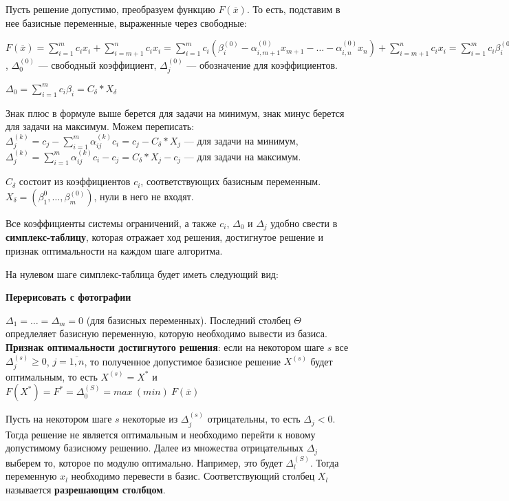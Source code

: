 \documentclass{article}
\begin{document}
Пусть решение допустимо, преобразуем функцию $F(\overline{x})$. То есть, подставим в нее базисные переменные, выраженные через свободные:

$F(\overline{x}) = \sum\limits_{i = 1}^{m} c_{i} x_{i} + \sum\limits_{i = m + 1}^{n} c_{i} x_{i} = \sum\limits_{i = 1}^{m} c_i (\beta_i^{(0)} - \alpha^{(0)}_{i, m + 1} x_{m + 1} - \dots - \alpha^{(0)}_{i, n} x_{n}) + \sum\limits_{i = m + 1}^{n} c_i x_i = \sum\limits_{i = 1}^{m} c_i \beta_i^{(0)} + \sum\limits_{j = m + 1}^{n} (c_j - \sum\limits_{i = 1}^{m} a_{i, j}^{(0)} c_{i}) x_j = \Delta_0^{(0)} \pm \sum\limits_{j = m + 1}^{n} \Delta_{j}^{(0)} x_{j}$, $\Delta_{0}^{(0)}$ — свободный коэффициент, $\Delta_{j}^{(0)}$ — обозначение для коэффициентов.

$\Delta_{0} = \sum\limits_{i = 1}^{m} c_{i} \beta_{i} = C_{\delta} * X_{\delta}$

Знак плюс в формуле выше берется для задачи на минимум, знак минус берется для задачи на максимум. Можем переписать: $\Delta_{j}^{(k)} = c_{j} - \sum\limits_{i = 1}^{m} \alpha_{i j}^{(k)} c_{i} = c_{j} - C_{\delta} * X_{j}$ — для задачи на минимум, $\Delta_{j}^{(k)} = \sum\limits_{i = 1}^{m} \alpha_{i j}^{(k)} c_{i} - c_{j}  = C_{\delta} * X_{j} - c_{j}$ — для задачи на максимум.

$C_{\delta}$ состоит из коэффициентов $c_{i}$, соответствующих базисным переменным. $X_{\delta} = (\beta_{1}^{0}, \dots, \beta_{m}^{(0)})$, нули в него не входят.

Все коэффициенты системы ограничений, а также $c_{i}$, $\Delta_0$ и $\Delta_{j}$ удобно свести в \textbf{симплекс-таблицу}, которая отражает ход решения, достигнутое решение и признак оптимальности на каждом шаге алгоритма.

На нулевом шаге симплекс-таблица будет иметь следующий вид:

\textbf{Перерисовать с фотографии}

$\Delta_1 = \dots = \Delta_{m} = 0$ (для базисных переменных). Последний столбец $\Theta$ опредлеляет базисную переменную, которую необходимо вывести из базиса. \textbf{Признак оптимальности достигнутого решения}: если на некотором шаге $s$ все $\Delta_{j}^{(s)} \ge 0$, $j = \overline{1, n}$, то полученное допустимое базисное решение $X^{(s)}$ будет оптимальным, то есть $X^{(s)} = X^{*}$ и $F(X^{*}) = F^{*} = \Delta_{0}^{(S)} = max \ (min) \ F(\overline{x})$

Пусть на некотором шаге $s$ некоторые из $\Delta_{j}^{(s)}$ отрицательны, то есть $\Delta_{j} < 0$. Тогда решение не является оптимальным и необходимо перейти к новому допустимому базисному решению. Далее из множества отрицательных $\Delta_{j}$ выберем то, которое по модулю оптимально. Например, это будет $\Delta_{l}^{(S)}$. Тогда переменную $x_{l}$ необходимо перевести в базис. Соответствующий столбец $X_{l}$ называется \textbf{разрешающим столбцом}. 
\end{document}
